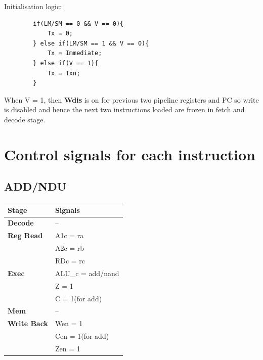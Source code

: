 \documentclass{article}
\begin{document}
Initialisation logic:
    \begin{lstlisting}
        if(LM/SM == 0 && V == 0){
            Tx = 0;
        } else if(LM/SM == 1 && V == 0){
            Tx = Immediate;
        } else if(V == 1){
            Tx = Txn;
        }
    \end{lstlisting}

When V = 1, then \textbf{Wdis} is on for previous two pipeline registers and PC
so write is disabled and hence the next two instructions loaded are frozen in
fetch and decode stage.


\section*{Control signals for each instruction}
\subsection*{ADD/NDU}

\begin{tabular}{|l|l|}
\hline
\textbf{Stage} & \textbf{Signals}\\
\hline
\textbf{Decode} & --\\
\hline
\textbf{Reg Read} & A1c = ra \\
                  & A2c = rb \\
                  & RDc = rc \\ 
\hline
\textbf{Exec} & ALU\_c = add/nand\\
              & Z = 1\\
              & C = 1(for add)\\  
\hline
\textbf{Mem} & --\\
\hline
\textbf{Write Back} & Wen = 1\\
                    & Cen = 1(for add)\\
                    & Zen = 1\\
\hline
\end{tabular}
\end{document}

